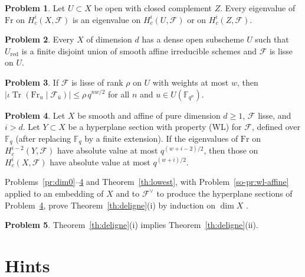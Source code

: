\documentclass[reqno]{amsart}
\theoremstyle{definition}
\newtheorem{problem}{Problem}[section]
\theoremstyle{plain}
\newcommand{\F}{\mathbb{F}}
\newcommand{\cF}{\mathcal{F}}
\newcommand{\Fr}{\mathrm{Fr}}
\newcommand{\Tr}{\operatorname{Tr}}
\begin{document}
\begin{problem}\label{pr:devissage}
Let \(U \subset X\) be open with closed complement \(Z\).  Every eigenvalue of \(\Fr\) on \(H^i_c(X, \cF)\) is an eigenvalue on \(H^i_c(U, \cF)\) or on \(H^i_c(Z, \cF)\).
\end{problem}

\begin{problem}\label{pr:lisse-open}
Every \(X\) of dimension \(d\) has a dense open subscheme \(U\) such that \(U_{\mathrm{red}}\) is a finite disjoint union of smooth affine irreducible schemes and \(\cF\) is lisse on \(U\).
\end{problem}

\begin{problem}\label{pr:traces}
If \(\cF\) is lisse of rank \(\rho\) on \(U\) with weights at most \(w\), then \(\lvert \iota\Tr(\Fr_u \mid \cF_{\bar u}) \rvert \le \rho\, q^{nw/2}\) for all \(n\) and \(u \in U(\F_{q^n})\).
\end{problem}

\begin{problem}\label{pr:higher}
Let \(X\) be smooth and affine of pure dimension \(d \ge 1\), \(\cF\) lisse, and \(i > d\).  Let \(Y \subset X\) be a hyperplane section with property (WL) for \(\cF\), defined over \(\F_q\) (after replacing \(\F_q\) by a finite extension).  If the eigenvalues of \(\Fr\) on \(H^{i-2}_c(Y, \cF)\) have absolute value at most \(q^{(w+i-2)/2}\), then those on \(H^i_c(X, \cF)\) have absolute value at most \(q^{(w+i)/2}\).
\end{problem}

Problems~\ref{pr:dim0}--\ref{pr:higher} and Theorem~\ref{th:lowest}, with Problem~\ref{so-pr:wl-affine} applied to an embedding of \(X\) and to \(\cF^\vee\) to produce the hyperplane sections of Problem~\ref{pr:higher}, prove Theorem~\ref{th:deligne}(i) by induction on \(\dim X\) \cite[\S 8]{Ald}.

\begin{problem}\label{pr:purity}
Theorem~\ref{th:deligne}(i) implies Theorem~\ref{th:deligne}(ii).
\end{problem}

\section*{Hints}
\end{document}
